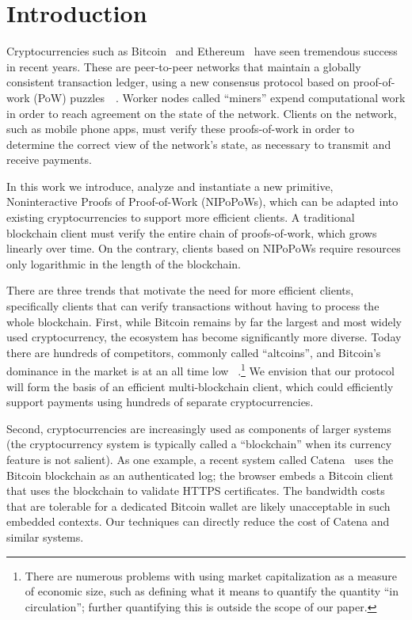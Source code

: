 \section{Introduction}

Cryptocurrencies such as Bitcoin~\cite{bitcoin}\cite{bitcoinsoftware} and
Ethereum~\cite{ethereum} have seen tremendous success in recent years. These are
peer-to-peer networks that maintain a globally consistent transaction ledger,
using a new consensus protocol based on proof-of-work (PoW)
puzzles~\cite{pow}~\cite{hashcash}. Worker nodes called ``miners'' expend
computational work in order to reach agreement on the state of the network.
Clients on the network, such as mobile phone apps, must verify these
proofs-of-work in order to determine the correct view of the network's state, as
necessary to transmit and receive payments.

In this work we introduce, analyze and instantiate a new primitive,
Noninteractive Proofs of Proof-of-Work (NIPoPoWs), which can be adapted into
existing cryptocurrencies to support more efficient clients. A traditional
blockchain client must verify the entire chain of proofs-of-work, which grows
linearly over time. On the contrary, clients based on NIPoPoWs require resources
only logarithmic in the length of the blockchain.

There are three trends that motivate the need for more efficient clients,
specifically clients that can verify transactions without having to process the
whole blockchain. First, while Bitcoin remains by far the largest and most
widely used cryptocurrency, the ecosystem has become significantly more diverse.
Today there are hundreds of competitors, commonly called ``altcoins'', and
Bitcoin's dominance in the market is at an all time low
~\cite{marketcap}.\footnote{There are numerous problems with using  market
capitalization as a measure of economic size, such as defining what it means to
quantify the quantity ``in circulation''; further quantifying this is outside
the scope of our paper.} We envision that our protocol will form the basis of an
efficient multi-blockchain client, which could efficiently support payments
using hundreds of separate cryptocurrencies.

Second, cryptocurrencies are increasingly used as components of larger systems
(the cryptocurrency system is typically called a ``blockchain'' when its
currency feature is not salient). As one example, a recent system called
Catena~\cite{catena} uses the Bitcoin blockchain as an authenticated log; the
browser embeds a Bitcoin client that uses the blockchain to validate HTTPS
certificates. The bandwidth costs that are tolerable for a dedicated Bitcoin
wallet are likely unacceptable in such embedded contexts. Our techniques can
directly reduce the cost of Catena and similar systems.

